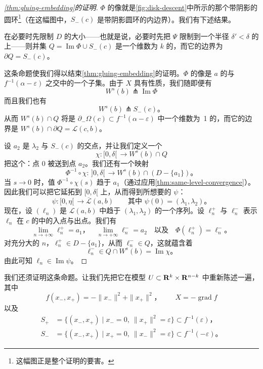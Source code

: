 \begin{proof}[\cref{thm:gluing-embedding}的证明]
$\Phi$ 的像就是\cref{fig:disk-descent}中所示的那个带阴影的圆环\footnote{这幅图正是整个证明的要害。}（在这幅图中，$S_-(c)$ 是带阴影圆环的内边界）。我们有下述结果。

\begin{proposition}\label{thm:annulus-boundary}
在必要时先限制 $D$ 的大小——也就是说，必要时先把 $\Psi$ 限制到一个半径 $\delta'<\delta$ 的\trDisk{}上——则并集
$Q=\operatorname{Im}\Phi\cup S_-(c)$
是一个维数为 $k$ 的\trManifoldWithBoundary，而它的边界为 $\partial Q=S_-(c)$。
\end{proposition}

这条命题使我们得以结束\cref{thm:gluing-embedding}的证明。$\Phi$ 的像是 $a$ 的\trUnstableManifold{}与\trLevelSet{} $f^{-1}(\alpha-\varepsilon)$ 之交中的一个\trOpen{}子集。由于 $X$ 具有\trSmale{}性质，我们随即便有
\[
W^s(b)\pitchfork\operatorname{Im}\Phi
\]
而且我们也有
\[
W^s(b)\pitchfork S_-(c)\text{。}
\]
从而 $W^s(b)\cap Q$ 将是 $\partial_-\Omega(c)\subset f^{-1}(\alpha-\varepsilon)$ 中一个维数为~1 的\trSubmanifold，而它的边界是 $W^s(b)\cap\partial Q=\mathcal{L}(c,b)$。

设 $a_2$ 是 $\lambda_2$ 与 $S_-(c)$ 的交点，并让我们定义一个\trParametrization
\[
\chi\colon[0,\delta[\,\longrightarrow W^s(b)\cap Q
\]
把这个\trManifoldWithBoundary{}\trParametrization：点 $0$ 被送到点 $a_2$。我们还有一个映射
\[
\Phi^{-1}\circ\chi\colon\,]0,\delta[\,\longrightarrow W^s(b)\cap(D-\{a_1\})\text{。}
\]
当 $s\to 0$ 时，值 $\Phi^{-1}\circ\chi(s)$ 趋于 $a_1$（通过应用\cref{thm:same-level-convergence}）。因此我们可以把它延拓到 $[0,\delta[$ 上，从而得到所想要的 $\psi$：
\[
\psi\colon[0,\eta[\,\longrightarrow\overline{\mathcal{L}}(a,b)
\qquad\text{其中 }\psi(0)=(\lambda_1,\lambda_2)\text{。}
\]
现在，设 $(\ell_n)$ 是 $\mathcal{L}(a,b)$ 中趋于 $(\lambda_1,\lambda_2)$ 的一个序列。设 $\ell_n^+$ 与 $\ell_n^-$ 表示 $\ell_n$ 在 $c$ 的\trMorseChart{}中的入点与出点。我们有
\[
\lim_{n\to+\infty}\ell_n^+=a_1\text{，}\quad
\lim_{n\to+\infty}\ell_n^-=a_2
\quad\text{以及}\quad \Phi(\ell_n^+)=\ell_n^-\text{。}
\]
对充分大的 $n$，$\ell_n^+\in D-\{a_1\}$，从而 $\ell_n^-\in Q$，这就蕴含着
\[
\ell_n^-\in Q\cap W^s(b)=\operatorname{Im}\chi\text{。}
\]
由此可知 $\ell_n\in\operatorname{Im}\psi$。
\end{proof}

我们还须证明这条命题。让我们先把它在\trMorse{}模型 $U\subset\mathbf{R}^k\times\mathbf{R}^{n-k}$ 中重新陈述一遍，其中
\[
f(x_-,x_+)=-\|x_-\|^2+\|x_+\|^2\text{，}\qquad X=-\operatorname{grad}f
\]
以及
\[
\begin{aligned}
S_+&=\{(x_-,x_+)\mid x_-=0,\ \|x_+\|^2=\varepsilon\}\subset f^{-1}(\varepsilon)\text{，}\\
S_-&=\{(x_-,x_+)\mid x_+=0,\ \|x_-\|^2=\varepsilon\}\subset f^{-1}(-\varepsilon)\text{。}
\end{aligned}
\]


